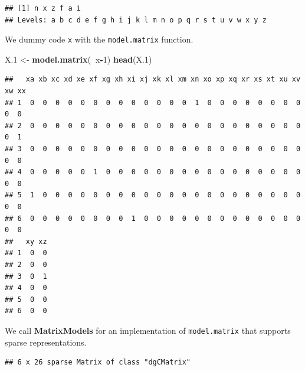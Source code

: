 \documentclass[]{book}
\newenvironment{Shaded}{\begin{snugshade}}{\end{snugshade}}
\newcommand{\KeywordTok}[1]{\textcolor[rgb]{0.13,0.29,0.53}{\textbf{#1}}}
\newcommand{\DecValTok}[1]{\textcolor[rgb]{0.00,0.00,0.81}{#1}}
\newcommand{\StringTok}[1]{\textcolor[rgb]{0.31,0.60,0.02}{#1}}
\newcommand{\CommentTok}[1]{\textcolor[rgb]{0.56,0.35,0.01}{\textit{#1}}}
\newcommand{\OperatorTok}[1]{\textcolor[rgb]{0.81,0.36,0.00}{\textbf{#1}}}
\newcommand{\NormalTok}[1]{#1}
\theoremstyle{definition}
\theoremstyle{definition}
\theoremstyle{definition}
\theoremstyle{remark}
\begin{document}
\begin{verbatim}
## [1] n x z f a i
## Levels: a b c d e f g h i j k l m n o p q r s t u v w x y z
\end{verbatim}

We dummy code \texttt{x} with the \texttt{model.matrix} function.

\begin{Shaded}
\begin{Highlighting}[]
\NormalTok{X.}\DecValTok{1}\NormalTok{ <-}\StringTok{ }\KeywordTok{model.matrix}\NormalTok{(}\OperatorTok{~}\NormalTok{x}\OperatorTok{-}\DecValTok{1}\NormalTok{)}
\KeywordTok{head}\NormalTok{(X.}\DecValTok{1}\NormalTok{)}
\end{Highlighting}
\end{Shaded}

\begin{verbatim}
##   xa xb xc xd xe xf xg xh xi xj xk xl xm xn xo xp xq xr xs xt xu xv xw xx
## 1  0  0  0  0  0  0  0  0  0  0  0  0  0  1  0  0  0  0  0  0  0  0  0  0
## 2  0  0  0  0  0  0  0  0  0  0  0  0  0  0  0  0  0  0  0  0  0  0  0  1
## 3  0  0  0  0  0  0  0  0  0  0  0  0  0  0  0  0  0  0  0  0  0  0  0  0
## 4  0  0  0  0  0  1  0  0  0  0  0  0  0  0  0  0  0  0  0  0  0  0  0  0
## 5  1  0  0  0  0  0  0  0  0  0  0  0  0  0  0  0  0  0  0  0  0  0  0  0
## 6  0  0  0  0  0  0  0  0  1  0  0  0  0  0  0  0  0  0  0  0  0  0  0  0
##   xy xz
## 1  0  0
## 2  0  0
## 3  0  1
## 4  0  0
## 5  0  0
## 6  0  0
\end{verbatim}

We call \textbf{MatrixModels} for an implementation of
\texttt{model.matrix} that supports sparse representations.

\begin{Shaded}
\end{Shaded}

\begin{verbatim}
## 6 x 26 sparse Matrix of class "dgCMatrix"
\end{verbatim}
\end{document}
